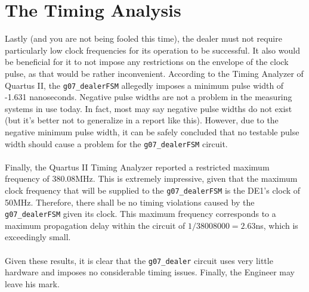 \documentclass[12pt]{report}
\begin{document}
\section*{The Timing Analysis}
Lastly (and you are not being fooled this time), the dealer must not require particularly low clock
frequencies for its operation to be successful. It also would be beneficial for it to not impose any
restrictions on the envelope of the clock pulse, as that would be rather inconvenient. According to
the Timing Analyzer of Quartus II, the \texttt{g07\_dealerFSM} allegedly imposes a minimum pulse
width of -1.631 nanoseconds. Negative pulse widths are not a problem
in the measuring systems in use today. In fact, most may say negative pulse widths do not exist (but
it's better not to generalize in a report like this). However, due to the negative minimum pulse
width, it can be safely concluded that no testable pulse width should cause a problem for the
\texttt{g07\_dealerFSM} circuit.\\\\
Finally, the Quartus II Timing Analyzer reported a restricted maximum frequency of 380.08MHz. This
is extremely impressive, given that the maximum clock frequency that will be supplied to the
\texttt{g07\_dealerFSM} is the DE1's clock of 50MHz. Therefore, there shall be no timing violations
caused by the \texttt{g07\_dealerFSM} given its clock. This maximum frequency corresponds to a
maximum propagation delay within the circuit of $1/38008000 = 2.63$ns, which is exceedingly
small.\\\\
Given these results, it is clear that the \texttt{g07\_dealer} circuit uses very little hardware and
imposes no considerable timing issues. Finally, the Engineer may leave his mark.
\end{document}
